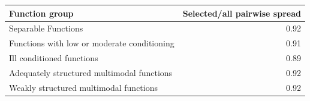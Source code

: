\begin{tabular}{lr}
\toprule
Function group & Selected/all pairwise spread \\
\midrule
Separable Functions & 0.92 \\
Functions with low or moderate conditioning & 0.91 \\
Ill conditioned functions & 0.89 \\
Adequately structured multimodal functions & 0.92 \\
Weakly structured multimodal functions & 0.92 \\
\bottomrule
\end{tabular}
